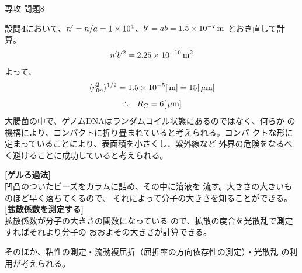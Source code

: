 \documentclass[fleqn]{jbook}
\begin{document}
\begin{answer}{専攻 問題8}{}
\begin{subanswers}
\SubAnswer

  設問{\bf 4}において、$n'=n/a=1\times 10^{4}$、$b'=ab=1.5\times 10^{-7}\,{\rm m}$
  とおき直して計算。
%
  \[ n'b^{\prime 2} = 2.25\times 10^{-10}\,{\rm m^2} \]
%
  よって、
%
  \[ \Mean{\vec{r{}}_{0n}^2}^{1/2}%
     = 1.5\Keta{-5}[\Unit{m}] = 15[\Unit{\mu m}] \]
  \[ \Yueni R_G =6 [\Unit{\mu m}] \] 
%
\SubAnswer
   大腸菌の中で、ゲノムDNAはランダムコイル状態にあるのではなく、何らか
   の機構により、コンパクトに折り畳まれていると考えられる。コンパ
   クトな形に定まっていることにより、表面積を小さくし、紫外線など
   外界の危険をなるべく避けることに成功していると考えられる。


\SubAnswer
  {\bf [ゲルろ過法]}\\
  凹凸のついたビーズをカラムに詰め、その中に溶液を
  流す。大きさの大きいものほど早く落ちてくるので、
  それによって分子の大きさを知ることができる。\\
  {\bf [拡散係数を測定する]}\\
  拡散係数が分子の大きさの関数になっている
  ので、拡散の度合を光散乱で測定すればそれより分子の
  おおよその大きさが計算できる。
  
  そのほか、粘性の測定・流動複屈折（屈折率の方向依存性の測定）・光散乱
  の利用が考えられる。
\end{subanswers}
\end{answer}
\end{document}
